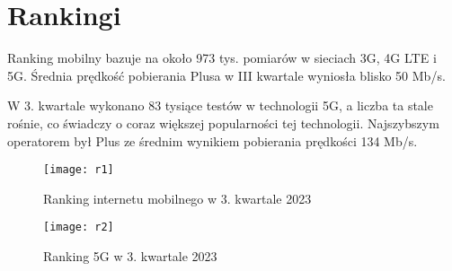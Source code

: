 \section{Rankingi}
Ranking mobilny bazuje na około 973 tys. pomiarów w sieciach 3G, 4G LTE i 5G. Średnia prędkość pobierania Plusa w III kwartale wyniosła blisko 50 Mb/s.

W 3. kwartale wykonano 83 tysiące testów w technologii 5G, a liczba ta stale rośnie, co świadczy o coraz większej popularności tej technologii. Najszybszym operatorem był Plus ze średnim wynikiem pobierania prędkości 134 Mb/s.

\begin{figure}[!htb]
    \centering
    \texttt{[image: r1]}
    \caption{Ranking internetu mobilnego w 3. kwartale 2023}
\end{figure}


\begin{figure}[!htb]
    \centering
    \texttt{[image: r2]}
    \caption{Ranking 5G w 3. kwartale 2023}
\end{figure}
